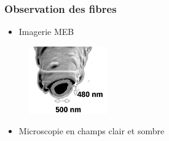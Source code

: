 \documentclass[9pt,a9paper,handout]{beamer}
\begin{document}
    \begin{frame}
        \frametitle{Observation des fibres}
        \begin{itemize}
            \item Imagerie MEB
        \end{itemize}
        \vspace*{-1cm}
        \begin{figure}\flushright
            \includegraphics[width=0.3\textwidth]{Images/PhotosPointes/photo_meb_exemple}
        \end{figure}
        
        \begin{itemize}
            \item Microscopie en champs clair et sombre
        \end{itemize}
        \vspace*{3mm}
        \begin{minipage}{\textwidth}
            \centering
            \hspace*{3mm}
        \end{minipage}
    \end{frame}
\end{document}
